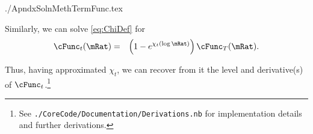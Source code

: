 \documentclass{econtex}
\begin{document}
\begin{verbatimwrite}{./ApndxSolnMethTermFunc.tex}
\begin{comment} %
\begin{eqnarray}
 \lim_{\mu \downarrow -\infty} \chi^{\prime}(\mu) & = & \left(\frac{-\left(\frac{\cFunc^{\prime}_{t}\cFunc_{T}^{\prime}\mRat-\cFunc_{t}^{\prime}\mRat\cFunc_{T}^{\prime}}{(\cFunc_{T}^{\prime}\mRat)^{2}}\mRat\right)}{(\cFunc_{T}^{\prime}\mRat-\cFunc_{t}^{\prime}\mRat)/\cFunc_{T}^{\prime}\mRat}\right)
\\ & = & \left(\frac{-\left(\frac{\cFunc^{\prime}_{t}\cFunc_{T}^{\prime}-\cFunc_{t}^{\prime}\cFunc_{T}^{\prime}}{(\cFunc_{T}^{\prime})^{2}}\right)}{(\cFunc_{T}^{\prime}-\cFunc_{t}^{\prime})/\cFunc_{T}^{\prime}}\right)
\\ & = & \left(\frac{-\left(\cFunc^{\prime}_{t}\cFunc_{T}^{\prime}-\cFunc_{t}^{\prime}\cFunc_{T}^{\prime}\right)}{(\cFunc_{T}^{\prime}-\cFunc_{t}^{\prime})\cFunc_{T}^{\prime}}\right)
\end{eqnarray}
\end{comment}

Similarly, we can solve \eqref{eq:ChiDef} for 
\begin{eqnarray}
    \cFunc_{t}(\mRat) & = & \left(1-e^{\chi_{t}(\log \mRat)}\right)\cFunc_{T}(\mRat) \label{eq:cFuncFromChi}.
\end{eqnarray}

Thus, having approximated $\chi_{t}$, we can recover from it 
the level and derivative(s) of $\cFunc_{t}$.\footnote{See
\texttt{./CoreCode/Documentation/Derivations.nb} for implementation
details and further derivations.}

\end{verbatimwrite}



\end{document}
